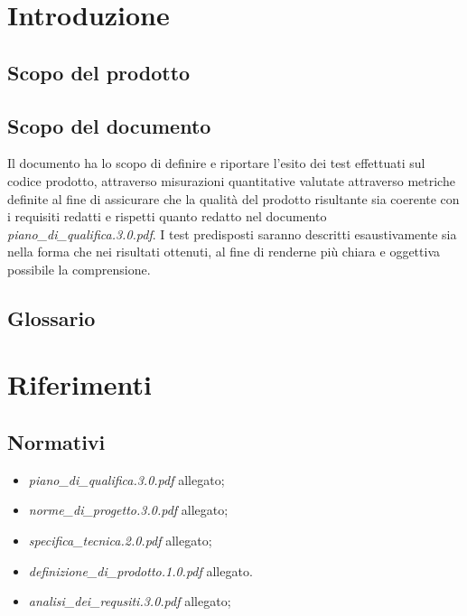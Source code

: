 

\setcounter{page}{1}
\pagestyle{normal}

\newpage

\section{Introduzione}
\subsection{Scopo del prodotto}
\purpose

\subsection{Scopo del documento}
Il documento ha lo scopo di definire e riportare l'esito dei test effettuati sul codice prodotto, attraverso misurazioni quantitative valutate attraverso metriche definite al fine di assicurare che la qualità del prodotto risultante sia coerente con i requisiti redatti e rispetti quanto redatto nel documento \textit{piano\_di\_qualifica.3.0.pdf}.
I test predisposti saranno descritti esaustivamente sia nella forma che nei risultati ottenuti, al fine di renderne più chiara e oggettiva possibile la comprensione.

\subsection{Glossario}
\glossaryIntro
\clearpage

\section{Riferimenti}
\subsection{Normativi}
\begin{itemize}
\item[] \textit{piano\_di\_qualifica.3.0.pdf} allegato;
\item[] \textit{norme\_di\_progetto.3.0.pdf} allegato;
\item[] \textit{specifica\_tecnica.2.0.pdf} allegato;
\item[] \textit{definizione\_di\_prodotto.1.0.pdf} allegato.
\item[] \textit{analisi\_dei\_requsiti.3.0.pdf} allegato;
\end{itemize}

